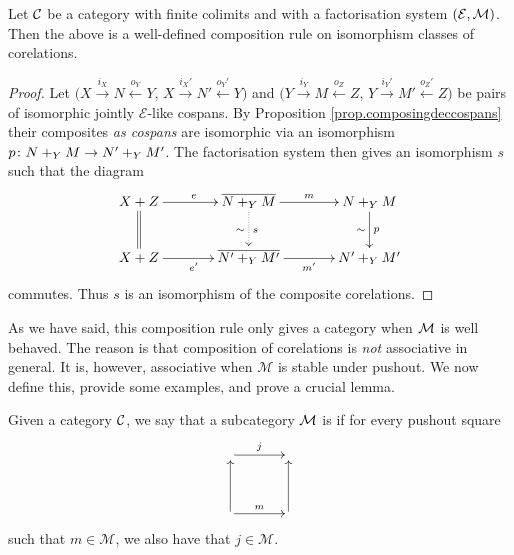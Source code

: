 \begin{proposition} \label{prop.corelcomp}
  Let $\mathcal C$ be a category with finite colimits and with a factorisation system
  $(\mathcal E,\mathcal M)$. Then the above is a well-defined composition rule on
  isomorphism classes of corelations.
\end{proposition}
\begin{proof}
  Let
  $(X \stackrel{i_X}{\longrightarrow} N \stackrel{o_Y}{\longleftarrow} Y$,
  $X \stackrel{i_X'}{\longrightarrow} N' \stackrel{o_Y'}{\longleftarrow} Y)$
  and
  $(Y \stackrel{i_Y}{\longrightarrow} M \stackrel{o_Z}{\longleftarrow} Z$, $Y
  \stackrel{i_Y'}{\longrightarrow} M' \stackrel{o_Z'}{\longleftarrow} Z)$
  be pairs of isomorphic jointly $\mathcal E$-like cospans. By Proposition
  \ref{prop.composingdeccospans} their composites \emph{as cospans} 
  are isomorphic via an isomorphism $p{\colon} N+_YM \to N'+_YM'$. The
  factorisation system then gives an isomorphism $s$ such that the diagram
  \[
    \xymatrixcolsep{3pc}
    \xymatrixrowsep{2pc}
    \xymatrix{
      X+Z \ar[r]^e \ar@{=}[d] & \overline{N+_YM} \ar[r]^m \ar@{.>}[d]^{s}_\sim & N+_YM
      \ar[d]_\sim^{p} \\
      X+Z \ar[r]_{e'}&\overline{N'+_YM'} \ar[r]_{m'} & N'+_YM'
    }
  \]
  commutes. Thus $s$ is an isomorphism of the composite corelations.
\end{proof}

As we have said, this composition rule only gives a category when $\mathcal M$ is
well behaved. The reason is that composition of corelations is \emph{not}
associative in general. It is, however, associative when $\mathcal M$ is stable
under pushout. We now define this, provide some examples, and prove a crucial
lemma.

\begin{definition}
  Given a category $\mathcal C$, we say that a subcategory $\mathcal M$ is  if for every pushout square
  \[
    \xymatrixcolsep{3pc}
    \xymatrixrowsep{3pc}
    \xymatrix{
      \ar[r]^j & \\
      \ar[u] \ar[r]^m &  \ar[u]
    }
  \]
  such that $m \in \mathcal M$, we also have that $j \in \mathcal M$. 
\end{definition}

